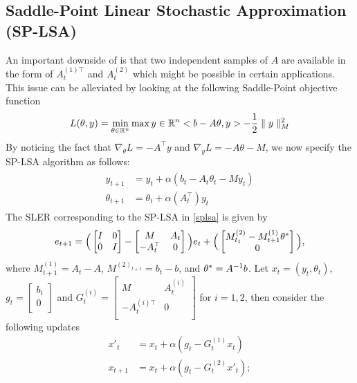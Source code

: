 \subsection{Saddle-Point Linear Stochastic Approximation (SP-LSA)}
An important downside of  is that two independent samples of $A$ are available in the form of $A^{(1)\top}_t$ and $A^{(2)}_t$ which might be possible in certain applications. This issue can be alleviated by looking at the following Saddle-Point objective function
\begin{align}
L(\theta,y)=\min_{\theta\in \mathbb{R}^n}\max{y\in \mathbb{R}^n}<b-A\theta,y>-\frac{1}{2}\parallel y\parallel_M ^2
\end{align}
By noticing the fact that $\nabla_\theta L =-A^\top y$ and $\nabla_{y}L=-A\theta-M$, we now specify the SP-LSA algorithm as follows:
\begin{align}\label{splsa}
\begin{split}
y_{t+1}&=y_t+\alpha (b_t-A_t\theta_t- M y_t)\\
\theta_{t+1}&=\theta_t+\alpha(A_t^\top)y_t
\end{split}
\end{align}
The SLER corresponding to the SP-LSA in \eqref{splsa} is given by
\begin{align}
e_{t+1}=\Big(\begin{bmatrix} I & 0 \\ 0 &I\\\end{bmatrix} -\begin{bmatrix} M & A_t \\ -A_t^\top &0\\\end{bmatrix}\Big)e_t+\Big(\begin{bmatrix} M^{(2)}_{t_1}-M^{(1)}_{t+1}\theta^*  \\ 0\\\end{bmatrix}\Big),
\end{align}
where $M^{(1)}_{t+1}=A_t-A$, $M^{(2)_{t+1}}=b_t-b$,  and $\theta^*=A^{-1}b$.
Let $x_t=(y_t,\theta_t)$, $g_t=\begin{bmatrix} b_t\\ 0\\\end{bmatrix}$ and $G^{(i)}_t=\begin{bmatrix} M & A^{(i)}_t \\ -A^{(i)\top}_t &0\\\end{bmatrix}$ for $i=1,2$, then consider the following updates
\begin{align}
x'_{t}&=x_t+\alpha (g_t-G^{(1)}_t x_t)\\
x_{t+1}&=x_t+\alpha(g_t- G^{(2)}_t x'_t);
\end{align}

